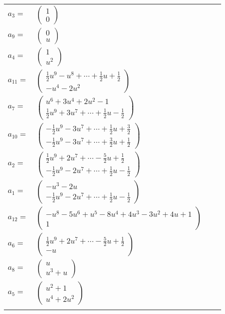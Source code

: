 \documentclass[1p]{elsarticle_modified}
\theoremstyle{definition}
\begin{document}
\begin{tabular}{m{7pt} m{180pt} m{7pt} m{180pt} }
\flushright $a_{3}=$&$\begin{pmatrix}1\\0\end{pmatrix}$ \\
\flushright $a_{9}=$&$\begin{pmatrix}0\\u\end{pmatrix}$ \\
\flushright $a_{4}=$&$\begin{pmatrix}1\\u^2\end{pmatrix}$ \\
\flushright $a_{11}=$&$\begin{pmatrix}\frac{1}{2} u^9- u^8+\cdots+\frac{1}{2} u+\frac{1}{2}\\- u^4-2 u^2\end{pmatrix}$ \\
\flushright $a_{7}=$&$\begin{pmatrix}u^6+3 u^4+2 u^2-1\\\frac{1}{2} u^9+3 u^7+\cdots+\frac{1}{2} u-\frac{1}{2}\end{pmatrix}$ \\
\flushright $a_{10}=$&$\begin{pmatrix}-\frac{1}{2} u^9-3 u^7+\cdots+\frac{1}{2} u+\frac{3}{2}\\-\frac{1}{2} u^9-3 u^7+\cdots+\frac{3}{2} u+\frac{1}{2}\end{pmatrix}$ \\
\flushright $a_{2}=$&$\begin{pmatrix}\frac{1}{2} u^9+2 u^7+\cdots-\frac{5}{2} u+\frac{1}{2}\\-\frac{1}{2} u^9-2 u^7+\cdots+\frac{1}{2} u-\frac{1}{2}\end{pmatrix}$ \\
\flushright $a_{1}=$&$\begin{pmatrix}- u^3-2 u\\-\frac{1}{2} u^9-2 u^7+\cdots+\frac{1}{2} u-\frac{1}{2}\end{pmatrix}$ \\
\flushright $a_{12}=$&$\begin{pmatrix}- u^8-5 u^6+u^5-8 u^4+4 u^3-3 u^2+4 u+1\\1\end{pmatrix}$ \\
\flushright $a_{6}=$&$\begin{pmatrix}\frac{1}{2} u^9+2 u^7+\cdots-\frac{5}{2} u+\frac{1}{2}\\- u\end{pmatrix}$ \\
\flushright $a_{8}=$&$\begin{pmatrix}u\\u^3+u\end{pmatrix}$ \\
\flushright $a_{5}=$&$\begin{pmatrix}u^2+1\\u^4+2 u^2\end{pmatrix}$\\&\end{tabular}
\end{document}
